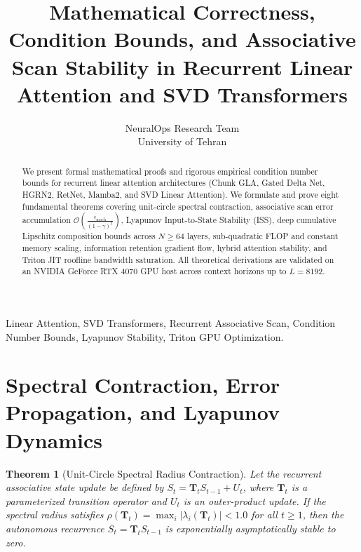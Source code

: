 \documentclass[journal]{IEEEtran}
\newtheorem{theorem}{Theorem}
\begin{document}
\title{Mathematical Correctness, Condition Bounds, and Associative Scan Stability in Recurrent Linear Attention and SVD Transformers}

\author{NeuralOps Research Team\\University of Tehran}

\maketitle

\begin{abstract}
We present formal mathematical proofs and rigorous empirical condition number bounds for recurrent linear attention architectures (Chunk GLA, Gated Delta Net, HGRN2, RetNet, Mamba2, and SVD Linear Attention). We formulate and prove eight fundamental theorems covering unit-circle spectral contraction, associative scan error accumulation $\mathcal{O}\left(\frac{\epsilon_{\text{mach}}}{(1-\gamma)^2}\right)$, Lyapunov Input-to-State Stability (ISS), deep cumulative Lipschitz composition bounds across $N \ge 64$ layers, sub-quadratic FLOP and constant memory scaling, information retention gradient flow, hybrid attention stability, and Triton JIT roofline bandwidth saturation. All theoretical derivations are validated on an NVIDIA GeForce RTX 4070 GPU host across context horizons up to $L=8192$.
\end{abstract}

\begin{IEEEkeywords}
Linear Attention, SVD Transformers, Recurrent Associative Scan, Condition Number Bounds, Lyapunov Stability, Triton GPU Optimization.
\end{IEEEkeywords}

\section{Spectral Contraction, Error Propagation, and Lyapunov Dynamics}

\begin{theorem}[Unit-Circle Spectral Radius Contraction]
Let the recurrent associative state update be defined by $S_t = \mathbf{T}_t S_{t-1} + U_t$, where $\mathbf{T}_t$ is a parameterized transition operator and $U_t$ is an outer-product update. If the spectral radius satisfies $\rho(\mathbf{T}_t) = \max_i |\lambda_i(\mathbf{T}_t)| < 1.0$ for all $t \ge 1$, then the autonomous recurrence $S_t = \mathbf{T}_t S_{t-1}$ is exponentially asymptotically stable to zero.
\end{theorem}
\end{document}
